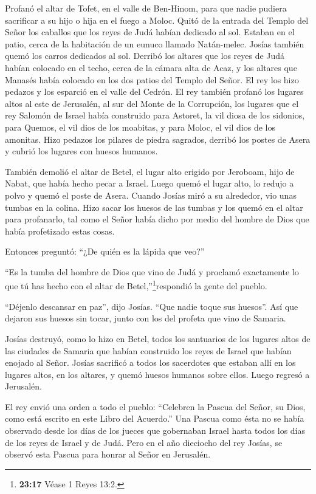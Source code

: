  Profanó el altar de Tofet, en el valle de Ben-Hinom, para
que nadie pudiera sacrificar a su hijo o hija en el fuego a Moloc.
 Quitó de la entrada del Templo del Señor los caballos que
los reyes de Judá habían dedicado al sol. Estaban en el patio, cerca de
la habitación de un eunuco llamado Natán-melec. Josías también quemó los
carros dedicados al sol.  Derribó los altares que los reyes
de Judá habían colocado en el techo, cerca de la cámara alta de Acaz, y
los altares que Manasés había colocado en los dos patios del Templo del
Señor. El rey los hizo pedazos y los esparció en el valle del Cedrón.
 El rey también profanó los lugares altos al este de
Jerusalén, al sur del Monte de la Corrupción, los lugares que el rey
Salomón de Israel había construido para Astoret, la vil diosa de los
sidonios, para Quemos, el vil dios de los moabitas, y para Moloc, el vil
dios de los amonitas.  Hizo pedazos los pilares de piedra
sagrados, derribó los postes de Asera y cubrió los lugares con huesos
humanos.

 También demolió el altar de Betel, el lugar alto erigido
por Jeroboam, hijo de Nabat, que había hecho pecar a Israel. Luego quemó
el lugar alto, lo redujo a polvo y quemó el poste de Asera.
 Cuando Josías miró a su alrededor, vio unas tumbas en la
colina. Hizo sacar los huesos de las tumbas y los quemó en el altar para
profanarlo, tal como el Señor había dicho por medio del hombre de Dios
que había profetizado estas cosas.

 Entonces preguntó: ``¿De quién es la lápida que veo?''

``Es la tumba del hombre de Dios que vino de Judá y proclamó exactamente
lo que tú has hecho con el altar de Betel,''\footnote{\textbf{23:17}
  Véase 1 Reyes 13:2.}respondió la gente del pueblo.

 ``Déjenlo descansar en paz'', dijo Josías. ``Que nadie
toque sus huesos''. Así que dejaron sus huesos sin tocar, junto con los
del profeta que vino de Samaria.

 Josías destruyó, como lo hizo en Betel, todos los
santuarios de los lugares altos de las ciudades de Samaria que habían
construido los reyes de Israel que habían enojado al Señor.
 Josías sacrificó a todos los sacerdotes que estaban allí
en los lugares altos, en los altares, y quemó huesos humanos sobre
ellos. Luego regresó a Jerusalén.

 El rey envió una orden a todo el pueblo: ``Celebren la
Pascua del Señor, su Dios, como está escrito en este Libro del
Acuerdo.''  Una Pascua como ésta no se había observado
desde los días de los jueces que gobernaban Israel hasta todos los días
de los reyes de Israel y de Judá.  Pero en el año dieciocho
del rey Josías, se observó esta Pascua para honrar al Señor en
Jerusalén.

